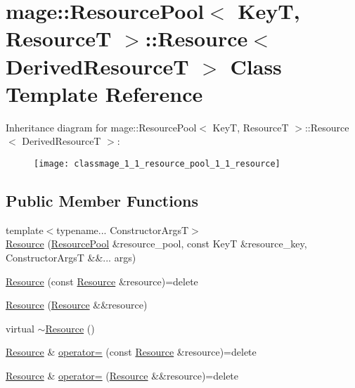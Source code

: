 \hypertarget{classmage_1_1_resource_pool_1_1_resource}{}\section{mage\+:\+:Resource\+Pool$<$ KeyT, ResourceT $>$\+:\+:Resource$<$ Derived\+ResourceT $>$ Class Template Reference}
\label{classmage_1_1_resource_pool_1_1_resource}
Inheritance diagram for mage\+:\+:Resource\+Pool$<$ KeyT, ResourceT $>$\+:\+:Resource$<$ Derived\+ResourceT $>$\+:\begin{figure}[H]
\begin{center}
\leavevmode
\texttt{[image: classmage\_1\_1\_resource\_pool\_1\_1\_resource]}
\end{center}
\end{figure}
\subsection*{Public Member Functions}
\begin{DoxyCompactItemize}
\item 
{\footnotesize template$<$typename... Constructor\+ArgsT$>$ }\\\mbox{\hyperlink{classmage_1_1_resource_pool_1_1_resource_a552bb997277371d36aa1bf2248d83f4f}{Resource}} (\mbox{\hyperlink{classmage_1_1_resource_pool}{Resource\+Pool}} \&resource\+\_\+pool, const KeyT \&resource\+\_\+key, Constructor\+ArgsT \&\&... args)
\item 
\mbox{\hyperlink{classmage_1_1_resource_pool_1_1_resource_a783237133052c9e41b4c2d02fcdeefec}{Resource}} (const \mbox{\hyperlink{classmage_1_1_resource_pool_1_1_resource}{Resource}} \&resource)=delete
\item 
\mbox{\hyperlink{classmage_1_1_resource_pool_1_1_resource_a1c8016d99e1496da9383cbc4f727a913}{Resource}} (\mbox{\hyperlink{classmage_1_1_resource_pool_1_1_resource}{Resource}} \&\&resource)
\item 
virtual \mbox{\hyperlink{classmage_1_1_resource_pool_1_1_resource_a1d8bd565ab8769cedd94c1a42c6ebf46}{$\sim$\+Resource}} ()
\item 
\mbox{\hyperlink{classmage_1_1_resource_pool_1_1_resource}{Resource}} \& \mbox{\hyperlink{classmage_1_1_resource_pool_1_1_resource_a9c619f220b0fa676111cd24cb575dbff}{operator=}} (const \mbox{\hyperlink{classmage_1_1_resource_pool_1_1_resource}{Resource}} \&resource)=delete
\item 
\mbox{\hyperlink{classmage_1_1_resource_pool_1_1_resource}{Resource}} \& \mbox{\hyperlink{classmage_1_1_resource_pool_1_1_resource_a56f04f53400e77ddcc3c26fad1342e31}{operator=}} (\mbox{\hyperlink{classmage_1_1_resource_pool_1_1_resource}{Resource}} \&\&resource)=delete
\end{DoxyCompactItemize}
